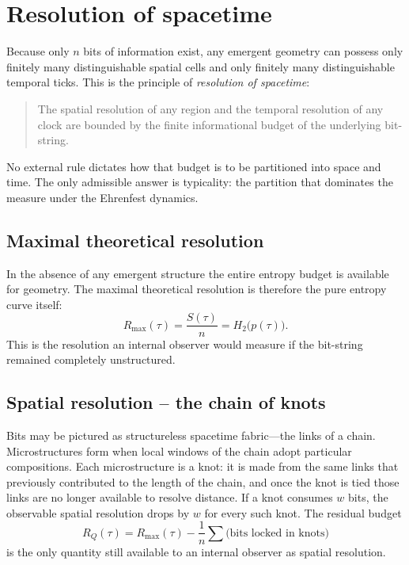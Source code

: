 \documentclass[11pt]{article}
\begin{document}
\section{Resolution of spacetime}

Because only \(n\) bits of information exist, any emergent geometry 
can possess only finitely many distinguishable spatial cells and only 
finitely many distinguishable temporal ticks. This is the principle 
of \emph{resolution of spacetime}:

\begin{quote}
  The spatial resolution of any region and the temporal resolution 
  of any clock are bounded by the finite informational budget of 
  the underlying bit-string.
\end{quote}

No external rule dictates how that budget is to be partitioned into 
space and time. The only admissible answer is typicality: the 
partition that dominates the measure under the Ehrenfest dynamics.

\subsection{Maximal theoretical resolution}

In the absence of any emergent structure the entire entropy budget 
is available for geometry. The maximal theoretical resolution is 
therefore the pure entropy curve itself:
\begin{equation}
  R_{\mathrm{max}}(\tau)=\frac{S(\tau)}{n}=H_2\bigl(p(\tau)\bigr).
\end{equation}
This is the resolution an internal observer would measure if the 
bit-string remained completely unstructured.

\subsection{Spatial resolution -- the chain of knots}

Bits may be pictured as structureless spacetime fabric---the links of 
a chain. Microstructures form when local windows of the chain adopt 
particular compositions. Each microstructure is a knot: it is made 
from the same links that previously contributed to the length of the 
chain, and once the knot is tied those links are no longer available 
to resolve distance. If a knot consumes \(w\) bits, the observable 
spatial resolution drops by \(w\) for every such knot. The residual 
budget
\begin{equation}
  R_Q(\tau)=R_{\mathrm{max}}(\tau)-\frac{1}{n}\sum\text{(bits locked in knots)}
\end{equation}
is the only quantity still available to an internal observer as 
spatial resolution.
\end{document}
